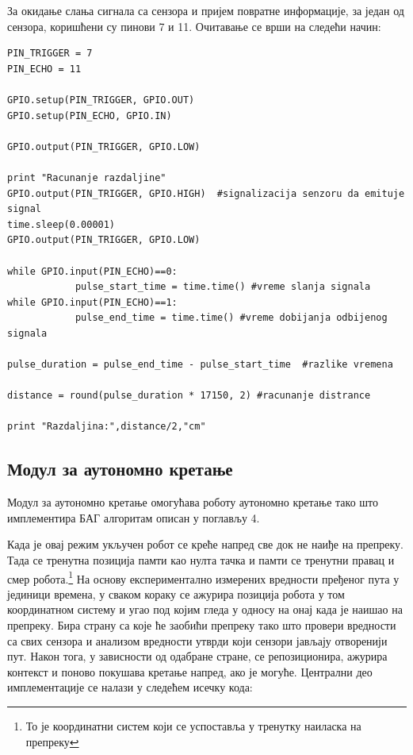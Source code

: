 \documentclass[12pt,oneside]{memoir}
\theoremstyle{remark}
\begin{document}
За окидање слања сигнала са сензора и пријем повратне информације, за један од сензора, коришћени су пинови 7 и 11. Очитавање се врши на следећи начин:
\begin{lstlisting}
PIN_TRIGGER = 7
PIN_ECHO = 11

GPIO.setup(PIN_TRIGGER, GPIO.OUT)
GPIO.setup(PIN_ECHO, GPIO.IN)

GPIO.output(PIN_TRIGGER, GPIO.LOW)

print "Racunanje razdaljine"
GPIO.output(PIN_TRIGGER, GPIO.HIGH)  #signalizacija senzoru da emituje signal
time.sleep(0.00001)
GPIO.output(PIN_TRIGGER, GPIO.LOW)

while GPIO.input(PIN_ECHO)==0:
            pulse_start_time = time.time() #vreme slanja signala
while GPIO.input(PIN_ECHO)==1:
            pulse_end_time = time.time() #vreme dobijanja odbijenog signala

pulse_duration = pulse_end_time - pulse_start_time  #razlike vremena

distance = round(pulse_duration * 17150, 2) #racunanje distrance

print "Razdaljina:",distance/2,"cm"
\end{lstlisting}


\subsection{Модул за аутономно кретање}
Модул за аутономно кретање омогућава роботу аутономно кретање тако што имплементира БАГ алгоритам описан у поглављу 4.

Када је овај режим укључен робот се креће напред све док не наиђе на препреку. Тада се тренутна позиција памти као нулта тачка и памти се тренутни правац и смер робота.\footnote{То је координатни систем који се успоставља у тренутку наиласка на препреку} 
На основу експериментално измерених вредности пређеног пута у јединици времена, у сваком кораку се ажурира позиција робота у том координатном систему и угао под којим гледа у односу на онај када је наишао на препреку. Бира страну са које ће заобићи препреку тако што провери вредности са свих сензора и анализом вредности утврди који сензори јављају отворенији пут. Након тога, у зависности од одабране стране, се репозиционира, ажурира контекст и поново покушава кретање напред, ако је могуће. Централни део имплементације се налази у следећем исечку кода:
\end{document}

